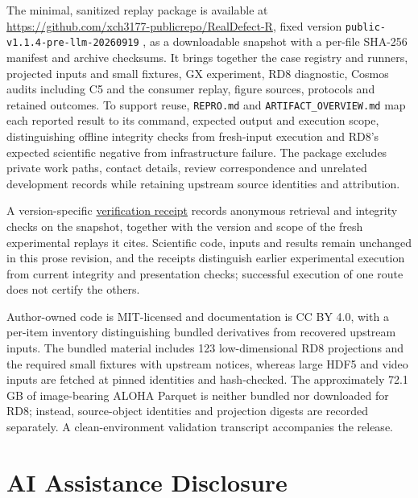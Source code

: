 \documentclass[conference]{IEEEtran}
\begin{document}
The minimal, sanitized replay package is available at \url{https://github.com/xch3177-publicrepo/RealDefect-R}, fixed version \texttt{public-v1.1.4-pre-llm-20260919} \cite{13}, as a downloadable snapshot with a per-file SHA-256 manifest and archive checksums. It brings together the case registry and runners, projected inputs and small fixtures, GX experiment, RD8 diagnostic, Cosmos audits including C5 and the consumer replay, figure sources, protocols and retained outcomes. To support reuse, \texttt{REPRO.md} and \texttt{ARTIFACT\_\allowbreak{}\allowbreak{}OVERVIEW.md} map each reported result to its command, expected output and execution scope, distinguishing offline integrity checks from fresh-input execution and RD8's expected scientific negative from infrastructure failure. The package excludes private work paths, contact details, review correspondence and unrelated development records while retaining upstream source identities and attribution.\par

A version-specific \href{https://github.com/xch3177-publicrepo/RealDefect-R/releases/download/public-v1.1.4-pre-llm-20260919/PUBLIC_ACCESS_VERIFICATION.json}{verification receipt} records anonymous retrieval and integrity checks on the snapshot, together with the version and scope of the fresh experimental replays it cites. Scientific code, inputs and results remain unchanged in this prose revision, and the receipts distinguish earlier experimental execution from current integrity and presentation checks; successful execution of one route does not certify the others.\par

Author-owned code is MIT-licensed and documentation is CC BY 4.0, with a per-item inventory distinguishing bundled derivatives from recovered upstream inputs. The bundled material includes 123 low-dimensional RD8 projections and the required small fixtures with upstream notices, whereas large HDF5 and video inputs are fetched at pinned identities and hash-checked. The approximately 72.1 GB of image-bearing ALOHA Parquet is neither bundled nor downloaded for RD8; instead, source-object identities and projection digests are recorded separately. A clean-environment validation transcript accompanies the release.\par

\section*{AI Assistance Disclosure}
\end{document}
